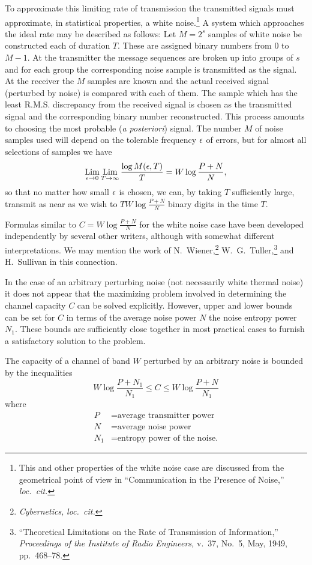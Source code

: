 To approximate this limiting rate of transmission the transmitted signals
must approximate, in statistical properties, a white noise.\footnote{This
and other properties of the white noise case are discussed from the
geometrical point of view in ``Communication in the Presence of Noise,''
{\it loc.~cit.}}  A system which approaches the ideal rate may be described
as follows:  Let $M=2^s$ samples of white noise be constructed each of
duration $T$.  These are assigned binary numbers from $0$ to $M-1$.  At the
transmitter the message sequences are broken up into groups of $s$ and for
each group the corresponding noise sample is transmitted as the signal.  At
the receiver the $M$ samples are known and the actual received signal
(perturbed by noise) is compared with each of them.  The sample which has
the least R.M.S. discrepancy from the received signal is chosen as the
transmitted signal and the corresponding binary number reconstructed.  This
process amounts to choosing the most probable (\emph{a posteriori}) signal.
The number $M$ of noise samples used will depend on the tolerable frequency
$\epsilon$ of errors, but for almost all selections of samples we have
$$
\lim_{\eps\to0}\lim_{T\to\infty}\frac{\log
M(\eps,T)}{T}=W\log\frac{P+N}{N},
$$
so that no matter how small $\epsilon$ is chosen, we can, by taking $T$
sufficiently large, transmit as near as we wish to $\displaystyle
TW\log\frac{P+N}{N}$ binary digits in the time $T$.

Formulas similar to $\displaystyle C=W\log\frac{P+N}{N}$ for the white
noise case have been developed independently by several other writers,
although with somewhat different interpretations.  We may mention the work
of N.~Wiener,\footnote{{\it Cybernetics,} {\it loc.~cit.}}
W.~G.~Tuller,\footnote{%
``Theoretical Limitations on the Rate of Transmission of Information,''
{\it Proceedings of the Institute of Radio Engineers,} v.~37, No.~5, May,
1949, pp.~468--78.} and H.~Sullivan in this connection.

In the case of an arbitrary perturbing noise (not necessarily white thermal
noise) it does not appear that the maximizing problem involved in
determining the channel capacity $C$ can be solved explicitly.  However,
upper and lower bounds can be set for $C$ in terms of the average noise
power $N$ the noise entropy power $N_1$.  These bounds are sufficiently
close together in most practical cases to furnish a satisfactory solution
to the problem.

\begin{theorem}
\label{thm:18}
The capacity of a channel of band $W$ perturbed by an arbitrary noise is
bounded by the inequalities
$$
W\log\frac{P+N_1}{N_1}\leq C\leq W\log\frac{P+N}{N_1}
$$
where
\begin{align*}
P&=\text{average transmitter power}\\
N&=\text{average noise power}\\
N_1&=\text{entropy power of the noise.}
\end{align*}
\end{theorem}

